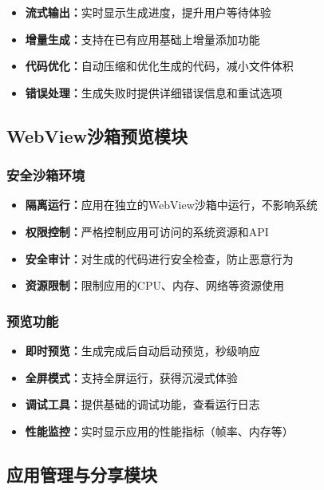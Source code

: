 \documentclass[a4paper,12pt]{ctexart}
\begin{document}
\begin{itemize}[leftmargin=2em]
    \item \textbf{流式输出：}实时显示生成进度，提升用户等待体验
    \item \textbf{增量生成：}支持在已有应用基础上增量添加功能
    \item \textbf{代码优化：}自动压缩和优化生成的代码，减小文件体积
    \item \textbf{错误处理：}生成失败时提供详细错误信息和重试选项
\end{itemize}

\subsection{WebView沙箱预览模块}

\subsubsection{安全沙箱环境}

\begin{itemize}[leftmargin=2em]
    \item \textbf{隔离运行：}应用在独立的WebView沙箱中运行，不影响系统
    \item \textbf{权限控制：}严格控制应用可访问的系统资源和API
    \item \textbf{安全审计：}对生成的代码进行安全检查，防止恶意行为
    \item \textbf{资源限制：}限制应用的CPU、内存、网络等资源使用
\end{itemize}

\subsubsection{预览功能}

\begin{itemize}[leftmargin=2em]
    \item \textbf{即时预览：}生成完成后自动启动预览，秒级响应
    \item \textbf{全屏模式：}支持全屏运行，获得沉浸式体验
    \item \textbf{调试工具：}提供基础的调试功能，查看运行日志
    \item \textbf{性能监控：}实时显示应用的性能指标（帧率、内存等）
\end{itemize}

\subsection{应用管理与分享模块}
\end{document}

